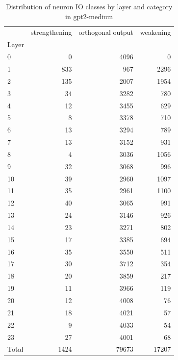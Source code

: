 \begin{table}
\caption{Distribution of neuron IO classes by layer and category in gpt2-medium}
\label{tab:gpt2-medium}
\begin{tabular}{lrrr}
 & strengthening & orthogonal output & weakening \\
Layer &  &  &  \\
0 & 0 & 4096 & 0 \\
1 & 833 & 967 & 2296 \\
2 & 135 & 2007 & 1954 \\
3 & 34 & 3282 & 780 \\
4 & 12 & 3455 & 629 \\
5 & 8 & 3378 & 710 \\
6 & 13 & 3294 & 789 \\
7 & 13 & 3152 & 931 \\
8 & 4 & 3036 & 1056 \\
9 & 32 & 3068 & 996 \\
10 & 39 & 2960 & 1097 \\
11 & 35 & 2961 & 1100 \\
12 & 40 & 3065 & 991 \\
13 & 24 & 3146 & 926 \\
14 & 23 & 3271 & 802 \\
15 & 17 & 3385 & 694 \\
16 & 35 & 3550 & 511 \\
17 & 30 & 3712 & 354 \\
18 & 20 & 3859 & 217 \\
19 & 11 & 3966 & 119 \\
20 & 12 & 4008 & 76 \\
21 & 18 & 4021 & 57 \\
22 & 9 & 4033 & 54 \\
23 & 27 & 4001 & 68 \\
Total & 1424 & 79673 & 17207 \\
\end{tabular}
\end{table}
